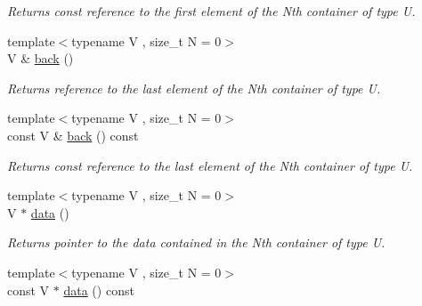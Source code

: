 \begin{DoxyCompactItemize}
\begin{DoxyCompactList}\small\item\em Returns const reference to the first element of the Nth container of type U. \end{DoxyCompactList}\item 
\hypertarget{classheterogeneous_1_1heterovector_3_01_t_01_4_a3884c029accf488ac875bc787a67caf3}{}{\footnotesize template$<$typename V , size\+\_\+t N = 0$>$ }\\V \& \hyperlink{classheterogeneous_1_1heterovector_3_01_t_01_4_a3884c029accf488ac875bc787a67caf3}{back} ()\label{classheterogeneous_1_1heterovector_3_01_t_01_4_a3884c029accf488ac875bc787a67caf3}

\begin{DoxyCompactList}\small\item\em Returns reference to the last element of the Nth container of type U. \end{DoxyCompactList}\item 
\hypertarget{classheterogeneous_1_1heterovector_3_01_t_01_4_ae0dab15d21e8b49c76510f0f60b66e28}{}{\footnotesize template$<$typename V , size\+\_\+t N = 0$>$ }\\const V \& \hyperlink{classheterogeneous_1_1heterovector_3_01_t_01_4_ae0dab15d21e8b49c76510f0f60b66e28}{back} () const \label{classheterogeneous_1_1heterovector_3_01_t_01_4_ae0dab15d21e8b49c76510f0f60b66e28}

\begin{DoxyCompactList}\small\item\em Returns const reference to the last element of the Nth container of type U. \end{DoxyCompactList}\item 
\hypertarget{classheterogeneous_1_1heterovector_3_01_t_01_4_a230c71a40f04a67a4b4e2fb15858e93e}{}{\footnotesize template$<$typename V , size\+\_\+t N = 0$>$ }\\V $\ast$ \hyperlink{classheterogeneous_1_1heterovector_3_01_t_01_4_a230c71a40f04a67a4b4e2fb15858e93e}{data} ()\label{classheterogeneous_1_1heterovector_3_01_t_01_4_a230c71a40f04a67a4b4e2fb15858e93e}

\begin{DoxyCompactList}\small\item\em Returns pointer to the data contained in the Nth container of type U. \end{DoxyCompactList}\item 
\hypertarget{classheterogeneous_1_1heterovector_3_01_t_01_4_a0c0fc3435bd9e3e93989546bd271c0e2}{}{\footnotesize template$<$typename V , size\+\_\+t N = 0$>$ }\\const V $\ast$ \hyperlink{classheterogeneous_1_1heterovector_3_01_t_01_4_a0c0fc3435bd9e3e93989546bd271c0e2}{data} () const \label{classheterogeneous_1_1heterovector_3_01_t_01_4_a0c0fc3435bd9e3e93989546bd271c0e2}


\end{DoxyCompactItemize}
